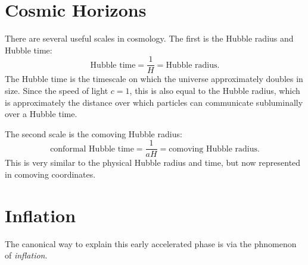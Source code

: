 \section{Cosmic Horizons}
There are several useful scales in cosmology. The first is the Hubble radius and Hubble time:
\begin{equation}
  \text{Hubble time} = \frac{1}{H} = \text{Hubble radius}.
  \label{eqn:cos:Hubble_def}
\end{equation}
The Hubble time is the timescale on which the universe approximately doubles in size. Since the speed of light $c=1$, this is also equal to the Hubble radius, which is approximately the distance over which particles can communicate subluminally over a Hubble time.

The second scale is the comoving Hubble radius:
\begin{equation}
  \text{conformal Hubble time} = \frac{1}{aH} = \text{comoving Hubble radius}.
  \label{eqn:cos:com_Hubble_def}
\end{equation}
This is very similar to the physical Hubble radius and time, but now represented in comoving coordinates.

%
%


\section{Inflation}
The canonical way to explain this early accelerated phase is via the phnomenon of {\em inflation}.


\clearpage{}

